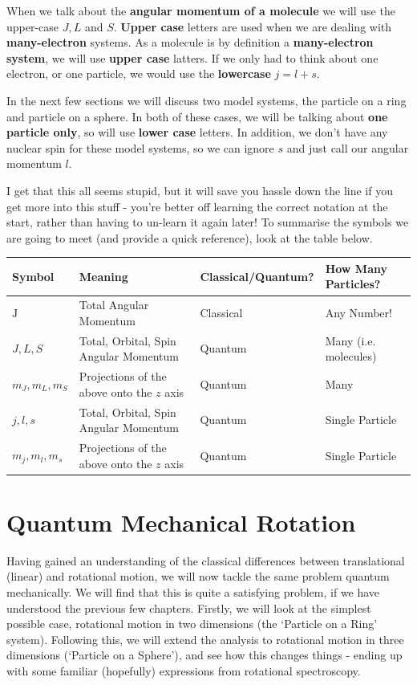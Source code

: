 \documentclass{memoir}[11pt,oneside,a4paper,openany]
\newcommand{\Jc}{\ensuremath{\mathrm{J}}}
\begin{document}
When we talk about the \textbf{angular momentum of a molecule} we will use the upper-case $J, L$ and $S$. \textbf{Upper case} letters are used when we are dealing with \textbf{many-electron} systems. As a molecule is by definition a \textbf{many-electron system}, we will use \textbf{upper case} latters. If we only had to think about one electron, or one particle, we would use the \textbf{lowercase} $j = l+s$. 

In the next few sections we will discuss two model systems, the particle on a ring and particle on a sphere. In both of these cases, we will be talking about \textbf{one particle only}, so will use \textbf{lower case} letters. In addition, we don't have any nuclear spin for these model systems, so we can ignore $s$ and just call our angular momentum $l$. 

I get that this all seems stupid, but it will save you hassle down the line if you get more into this stuff - you're better off learning the correct notation at the start, rather than having to un-learn it again later! To summarise the symbols we are going to meet (and provide a quick reference), look at the table below.
\begin{table}[h]
	\begin{center}
\begin{tabular}{@{}llll@{}}
\toprule
Symbol & Meaning & Classical/Quantum? & How Many Particles? \\ \midrule
$\Jc$ & Total Angular Momentum & Classical & Any Number!\\
$J, L, S$ & Total, Orbital, Spin Angular Momentum & Quantum & Many (i.e. molecules) \\
$m_J, m_L, m_S$ & Projections of the above onto the $z$ axis & Quantum & Many \\
$j, l, s$ & Total, Orbital, Spin Angular Momentum & Quantum & Single Particle \\
$m_j, m_l, m_s$ & Projections of the above onto the $z$ axis & Quantum & Single Particle \\ \bottomrule
\end{tabular}
		\end{center}
\end{table}

\section{Quantum Mechanical Rotation}
Having gained an understanding of the classical differences between translational (linear) and rotational motion, we will now tackle the same problem quantum mechanically. We will find that this is quite a satisfying problem, if we have understood the previous few chapters. Firstly, we will look at the simplest possible case, rotational motion in two dimensions (the `Particle on a Ring' system). Following this, we will extend the analysis to rotational motion in three dimensions (`Particle on a Sphere'), and see how this changes things - ending up with some familiar (hopefully) expressions from rotational spectroscopy. 
\end{document}

